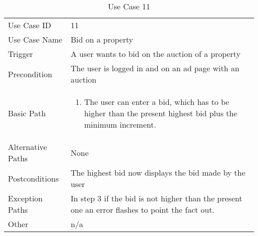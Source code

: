 \begin{table}[H]
\centering
\label{table-use-case-11}
\begin{tabular}{|p{3cm}|p{10cm}}
Use Case ID       & 11                                                         \\
Use Case Name     & Bid on a property                                                          \\
Trigger           & A user wants to bid on the auction of a property                                          \\
Precondition      & The user is logged in and on an ad page with an auction                                                 \\
Basic Path        & \begin{enumerate}
\item The user can enter a bid, which has to be higher than the
present highest bid plus the minimum increment. 
\end{enumerate} 
     \\
Alternative Paths & None                          \\
Postconditions    & The highest bid now displays the bid made by the user                                                       \\
Exception Paths   & In step 3 if the bid is not higher than the present one an error flashes to point the fact out.					\\
Other             & n/a                                                                                                                                                                                                        
\end{tabular}
\caption{Use Case 11}
\end{table}


